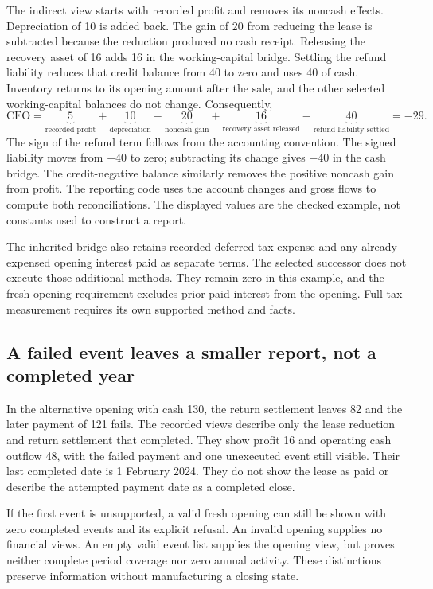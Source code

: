 The indirect view starts with recorded profit and removes its noncash effects.
Depreciation of 10 is added back. The gain of 20 from reducing the lease is
subtracted because the reduction produced no cash receipt. Releasing the
recovery asset of 16 adds 16 in the working-capital bridge. Settling the refund
liability reduces that credit balance from 40 to zero and uses 40 of cash.
Inventory returns to its opening amount after the sale, and the other selected
working-capital balances do not change. Consequently,
\[
 \mathrm{CFO}
 =\underbrace{5}_{\text{recorded profit}}
  +\underbrace{10}_{\text{depreciation}}
  -\underbrace{20}_{\text{noncash gain}}
  +\underbrace{16}_{\text{recovery asset released}}
  -\underbrace{40}_{\text{refund liability settled}}
 =-29.
\]
The sign of the refund term follows from the accounting convention. The signed
liability moves from $-40$ to zero; subtracting its change gives $-40$ in the
cash bridge. The credit-negative  balance similarly removes
the positive noncash gain from profit. The reporting code uses the account
changes and gross flows to compute both reconciliations. The displayed values
are the checked example, not constants used to construct a report.

The inherited bridge also retains recorded deferred-tax expense and any
already-expensed opening interest paid as separate terms. The selected
successor does not execute those additional methods. They remain zero in this
example, and the fresh-opening requirement excludes prior paid interest from
the opening. Full tax measurement requires its own supported method and facts.

\subsection{A failed event leaves a smaller report, not a completed year}

In the alternative opening with cash 130, the return settlement leaves 82 and
the later payment of 121 fails. The recorded views describe only the lease
reduction and return settlement that completed. They show profit 16 and
operating cash outflow 48, with the failed payment and one unexecuted event
still visible. Their last completed date is 1 February 2024. They do not show
the lease as paid or describe the attempted payment date as a completed close.

If the first event is unsupported, a valid fresh opening can still be shown
with zero completed events and its explicit refusal. An invalid opening
supplies no financial views. An empty valid event list supplies the opening
view, but proves neither complete period coverage nor zero annual activity.
These distinctions preserve information without manufacturing a closing state.


